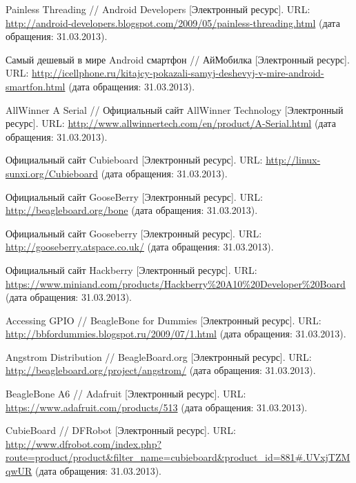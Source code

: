 \documentclass[twoside,a4paper]{msmb} %
\begin{document}
\begin{thebibliography}{99}
Painless Threading // Android Developers [Электронный ресурс].
URL: \url{http://android-developers.blogspot.com/2009/05/painless-threading.html} (дата обращения: 31.03.2013).

Самый дешевый в мире Android смартфон // АйМобилка [Электронный ресурс].
URL: \url{http://icellphone.ru/kitajcy-pokazali-samyj-deshevyj-v-mire-android-smartfon.html} (дата обращения: 31.03.2013).


AllWinner A Serial // Официальный сайт AllWinner Technology [Электронный ресурс].
URL: \url{http://www.allwinnertech.com/en/product/A-Serial.html} (дата обращения: 31.03.2013).

Официальный сайт Cubieboard [Электронный ресурс].
URL: \url{http://linux-sunxi.org/Cubieboard} (дата обращения: 31.03.2013).

Официальный сайт GooseBerry [Электронный ресурс].
URL: \url{http://beagleboard.org/bone} (дата обращения: 31.03.2013).

Официальный сайт Gooseberry [Электронный ресурс].
URL: \url{http://gooseberry.atspace.co.uk/} (дата обращения: 31.03.2013).

Официальный сайт Hackberry [Электронный ресурс].
URL: \url{https://www.miniand.com/products/Hackberry\%20A10\%20Developer\%20Board} (дата обращения: 31.03.2013).

Accessing GPIO // BeagleBone for Dummies [Электронный ресурс].
URL: \url{http://bbfordummies.blogspot.ru/2009/07/1.html} (дата обращения: 31.03.2013).

Angstrom Distribution // BeagleBoard.org [Электронный ресурс].
URL: \url{http://beagleboard.org/project/angstrom/} (дата обращения: 31.03.2013).

BeagleBone A6 // Adafruit [Электронный ресурс].
URL: \url{https://www.adafruit.com/products/513} (дата обращения: 31.03.2013).

CubieBoard // DFRobot [Электронный ресурс].
URL: \url{http://www.dfrobot.com/index.php?route=product/product&filter_name=cubieboard&product_id=881#.UVxjTZMqwUR} (дата обращения: 31.03.2013).

\end{thebibliography}

\endarticle  %
\end{document}
